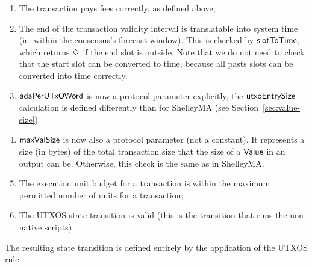 \begin{enumerate}
  \item The transaction pays fees correctly, as defined above;

  \item The end of the transaction validity interval is translatable into
  system time (ie. within the consensus's forecast window). This is checked
  by $\mathsf{slotToTime}$, which returns $\Diamond$ if the end slot is outside.
  Note that we do not need to check that the start slot can be converted to
  time, because all pasts slots can be converted into time correctly.

  \item $\mathsf{adaPerUTxOWord}$ is now a protocol parameter explicitly, the
  $\mathsf{utxoEntrySize}$ calculation is defined differently than for ShelleyMA
  (see Section~\ref{sec:value-size})

  \item $\mathsf{maxValSize}$ is now also a protocol parameter (not a constant).
  It represents a size (in bytes) of the total transaction
  size that the size of a $\mathsf{Value}$ in an output can be. Otherwise, this check is
  the same as in ShelleyMA.

 \item The execution unit budget for a transaction is within the maximum
  permitted number of units for a transaction;

  \item The UTXOS state transition is valid (this is the transition that runs the
  non-native scripts)
\end{enumerate}

The resulting state transition is defined entirely by the application of the
UTXOS rule.

